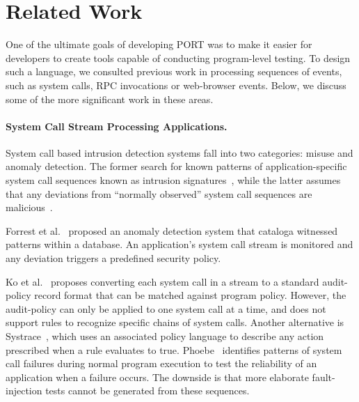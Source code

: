 \section{Related Work}
\label{SEC:related-work}

One of the ultimate goals of developing PORT
was to make it easier for developers to
create tools capable of
conducting program-level testing.
To design such a language,
we consulted
previous work
in processing sequences of events, such as
system calls, RPC invocations or
web-browser events.
Below, we discuss some of the more significant work in these areas.

\paragraph{System Call Stream Processing Applications.}

System call based intrusion detection systems fall into two categories: misuse and anomaly detection.
The former search for known patterns of application-specific
system call
sequences known as intrusion signatures~\cite{GARCIATEODORO200918}, while
the latter assumes that
any deviations
from ``normally observed'' system call sequences are
malicious~\cite{DBLP:conf/sp/ForrestHSL96}.

Forrest et al.~\cite{DBLP:conf/sp/ForrestHSL96} proposed
an anomaly detection system that cataloga  witnessed patterns  within a database.
An application's system call stream
is monitored and any
deviation triggers a
predefined security policy.


Ko et al.~\cite{DBLP:conf/acsac/KoFL94}
proposes converting each system call in a
stream to a standard audit-policy record format that can be
matched against program policy.
However, the audit-policy can only be applied to
one system call at a time,
and does not support rules to recognize specific chains of system calls.
Another alternative is
Systrace~\cite{DBLP:conf/uss/Provos03},
which uses an associated policy language
to describe any action prescribed when a rule evaluates to true.
Phoebe~\cite{DBLP:journals/corr/abs-2006-04444}
identifies patterns of system call failures during normal program execution
to test the reliability of an application when a failure occurs.
The downside is that more elaborate fault-injection
tests cannot be generated from these sequences.


